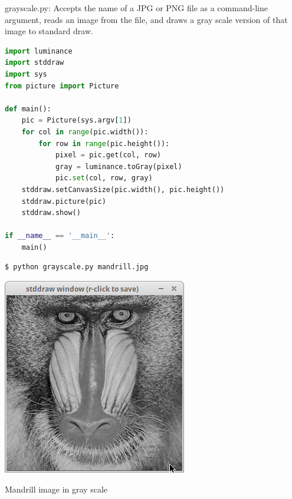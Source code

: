 \documentclass[8pt,a4paper,compress,handout]{beamer}
\begin{document}
\begin{frame}[fragile]
\begin{framed}
\tiny grayscale.py: Accepts the name of a JPG or PNG file as a command-line argument, reads an image from the file, and draws a gray scale version of that image to standard draw.
\end{framed}

\begin{lstlisting}[language=Python]
import luminance
import stddraw
import sys
from picture import Picture

def main():
    pic = Picture(sys.argv[1])
    for col in range(pic.width()):
        for row in range(pic.height()):
            pixel = pic.get(col, row)
            gray = luminance.toGray(pixel)
            pic.set(col, row, gray)
    stddraw.setCanvasSize(pic.width(), pic.height())
    stddraw.picture(pic)
    stddraw.show()

if __name__ == '__main__':
    main()
\end{lstlisting}

\begin{minipage}{200pt}
\begin{lstlisting}[language={}]
$ python grayscale.py mandrill.jpg
\end{lstlisting}
\end{minipage}%
\hfill
\begin{minipage}{100pt}
\begin{center}
\includegraphics[scale=0.2]{figures/grayscale.png}

\smallskip

\tiny Mandrill image in gray scale
\end{center}
\end{minipage}
\end{frame}
\end{document}
